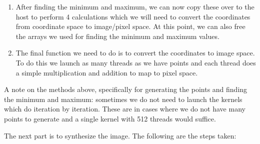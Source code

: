 \begin{enumerate}
	\item After finding the minimum and maximum, we can now copy these over to the host to perform 4 calculations which we will need to convert the coordinates from coordinate space to image/pixel space. At this point, we can also free the arrays we used for finding the minimum and maximum values.
	
	\item The final function we need to do is to convert the coordinates to image space. To do this we launch as many threads as we have points and each thread does a simple multiplication and addition to map to pixel space.
\end{enumerate}

A note on the methods above, specifically for generating the points and finding the minimum and maximum: sometimes we do not need to launch the kernels which do iteration by iteration. These are in cases where we do not have many points to generate and a single kernel with 512 threads would suffice.

The next part is to synthesize the image. The following are the steps taken:

